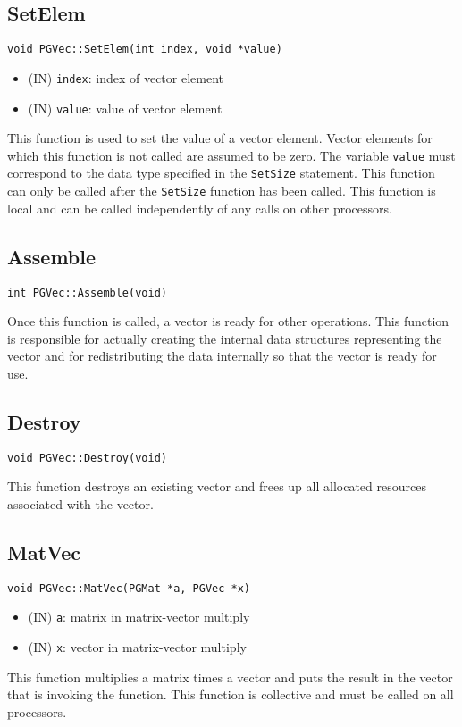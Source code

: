 \documentclass[12pt]{article}
\begin{document}
\subsection{SetElem}
\begin{verbatim}
void PGVec::SetElem(int index, void *value)
\end{verbatim}
\begin{itemize}
\item (IN) \texttt{index}: index of vector element
\item (IN) \texttt{value}: value of vector element
\end{itemize}
This function is used to set the value of a vector element. Vector elements for
which this function is not called are assumed to be zero. The variable \texttt{value}
must correspond to the data type specified in the \texttt{SetSize} statement.
This function can only be called after the \texttt{SetSize} function has been called.
This function is local and can be called independently of any calls on other
processors.
\subsection{Assemble}
\begin{verbatim}
int PGVec::Assemble(void)
\end{verbatim}
Once this function is called, a vector is ready for other operations. This
function is responsible for actually creating the internal data structures
representing the vector and for redistributing the data internally so that the
vector is ready for use.
\subsection{Destroy}
\begin{verbatim}
void PGVec::Destroy(void)
\end{verbatim}
This function destroys an existing vector and frees up all allocated resources
associated with the vector.
\subsection{MatVec}
\begin{verbatim}
void PGVec::MatVec(PGMat *a, PGVec *x)
\end{verbatim}
\begin{itemize}
\item (IN) \texttt{a}: matrix in matrix-vector multiply
\item (IN) \texttt{x}: vector in matrix-vector multiply
\end{itemize}
This function multiplies a matrix times a vector and puts the result in the
vector that is invoking the function. This function is collective and must be
called on all processors.
\end{document}

